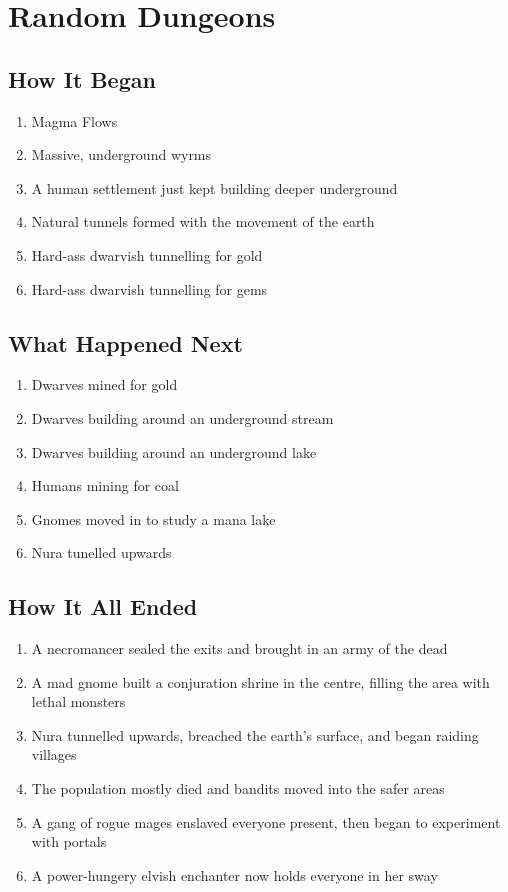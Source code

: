 
\section{Random Dungeons}

\subsection{How It Began}

\begin{enumerate}

\item{Magma Flows}
\item{Massive, underground wyrms}
\item{A human settlement just kept building deeper underground}
\item{Natural tunnels formed with the movement of the earth}
\item{Hard-ass dwarvish tunnelling for gold}
\item{Hard-ass dwarvish tunnelling for gems}
\end{enumerate}

\subsection{What Happened Next}
\begin{enumerate}

\item{Dwarves mined for gold}
\item{Dwarves building around an underground stream}
\item{Dwarves building around an underground lake}
\item{Humans mining for coal}
\item{Gnomes moved in to study a mana lake}
\item{Nura tunelled upwards}
\end{enumerate}

\subsection{How It All Ended}

\begin{enumerate}

\item{A necromancer sealed the exits and brought in an army of the dead}
\item{A mad gnome built a conjuration shrine in the centre, filling the area with lethal monsters}
\item{Nura tunnelled upwards, breached the earth's surface, and began raiding villages}
\item{The population mostly died and bandits moved into the safer areas}
\item{A gang of rogue mages enslaved everyone present, then began to experiment with portals}
\item{A power-hungery elvish enchanter now holds everyone in her sway}

\end{enumerate}

